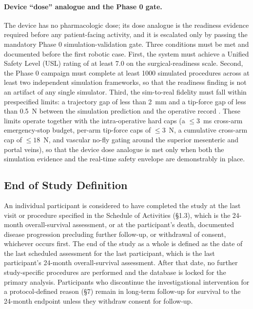 \paragraph{Device ``dose'' analogue and the Phase 0 gate.}
The device has no pharmacologic dose; its dose analogue is the readiness evidence
required before any patient-facing activity, and it is escalated only by passing
the mandatory Phase 0 simulation-validation gate. Three conditions must be met
and documented before the first robotic case. First, the system must achieve a
Unified Safety Level (USL) rating of at least 7.0 on the surgical-readiness scale.
Second, the Phase 0 campaign must complete at least 1000 simulated procedures
across at least two independent simulation frameworks, so that the readiness
finding is not an artifact of any single simulator. Third, the sim-to-real
fidelity must fall within prespecified limits: a trajectory gap of less than 2~mm
and a tip-force gap of less than 0.5~N between the simulation prediction and the
operative record \cite{ecfr2026part812}. These limits operate together with the
intra-operative hard caps (a $\leq 3$~ms cross-arm emergency-stop budget, per-arm
tip-force caps of $\leq 3$~N, a cumulative cross-arm cap of $\leq 18$~N, and
vascular no-fly gating around the superior mesenteric and portal veins), so that
the device dose analogue is met only when both the simulation evidence and the
real-time safety envelope are demonstrably in place.

\subsection{End of Study Definition}

An individual participant is considered to have completed the study at the last
visit or procedure specified in the Schedule of Activities (\S1.3), which is the
24-month overall-survival assessment, or at the participant's death,
documented disease progression precluding further follow-up, or withdrawal of
consent, whichever occurs first. The end of the study as a whole is defined as the
date of the last scheduled assessment for the last participant, which is the last
participant's 24-month overall-survival assessment. After that date, no further
study-specific procedures are performed and the database is locked for the primary
analysis. Participants who discontinue the investigational intervention for a
protocol-defined reason (\S7) remain in long-term follow-up for survival to the
24-month endpoint unless they withdraw consent for follow-up.
